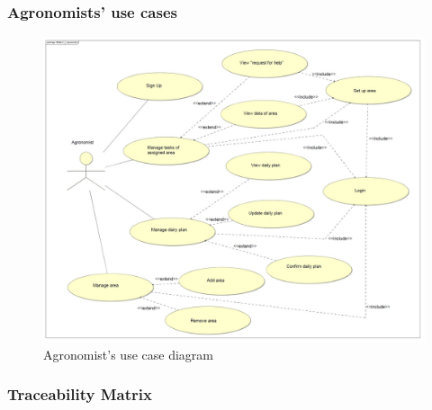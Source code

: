 \subsubsection*{Agronomists' use cases}
\begin{figure}[H]
	\centering
    \includegraphics[page=1, width=\textwidth]{Images/ud_ag.JPG}

	\caption{\label{fig:a_use_case_diagram}Agronomist's use case diagram}

\end{figure}
\label{sect:agronomist_requirements}



\subsubsection{Traceability Matrix}
\label{sec:traceability_matrix}


